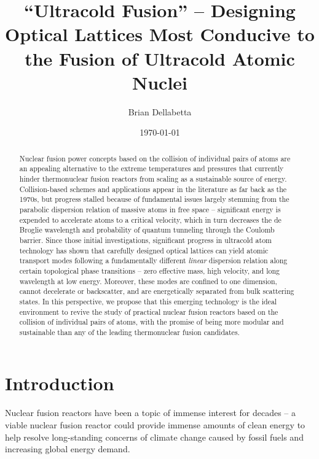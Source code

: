 \documentclass[onecolumn,
               superscriptaddress,
               floatfix,
               longbibliography, 
               showkeys,apl]{revtex4-2}
\begin{document}
\title{``Ultracold Fusion'' -- Designing Optical Lattices Most Conducive to the Fusion of Ultracold Atomic Nuclei}

\author{Brian Dellabetta}


\date{\today}
%
\begin{abstract}
Nuclear fusion power concepts based on the collision of individual pairs of atoms are an appealing alternative to the extreme temperatures and pressures that currently hinder thermonuclear fusion reactors from scaling as a sustainable source of energy. Collision-based schemes and applications appear in the literature as far back as the 1970s, but progress stalled because of fundamental issues largely stemming from the parabolic dispersion relation of massive atoms in free space -- significant energy is expended to accelerate atoms to a critical velocity, which in turn decreases the de Broglie wavelength and probability of quantum tunneling through the Coulomb barrier. Since those initial investigations, significant progress in ultracold atom technology has shown that carefully designed optical lattices can yield atomic transport modes following a fundamentally different \textit{linear} dispersion relation along certain topological phase transitions -- zero effective mass, high velocity, and long wavelength at low energy. Moreover, these modes are confined to one dimension, cannot decelerate or backscatter, and are energetically separated from bulk scattering states. In this perspective, we propose that this emerging technology is the ideal environment to revive the study of practical nuclear fusion reactors based on the collision of individual pairs of atoms, with the promise of being more modular and sustainable than any of the leading thermonuclear fusion candidates.

\end{abstract}

\maketitle

\section{Introduction}

Nuclear fusion reactors have been a topic of immense interest for decades -- a viable nuclear fusion reactor could provide immense amounts of clean energy to help resolve long-standing concerns of climate change caused by fossil fuels and increasing global energy demand.
\end{document}
